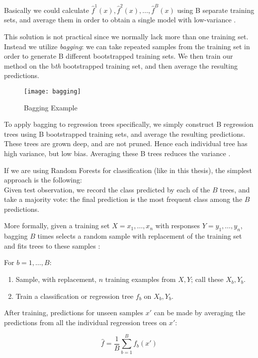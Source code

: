 Basically we could calculate $\hat{f}^1(x), \hat{f}^2(x), \dots, \hat{f}^B(x)$ using B separate training sets, and average them in order to obtain a single model with low-variance \cite{ISLR}.

This solution is not practical since we normally lack more than one training set. \\
Instead we utilize \textit{bagging}: we can take repeated samples from the training set in order to generate B different bootstrapped training sets. We then train our method on the b\textit{th} bootstrapped training set, and then average the resulting predictions.

\begin{figure}[H]
	\centering
	\texttt{[image: bagging]}
	\caption{Bagging Example \cite{bagging}}
	\label{fig:bagging}
\end{figure}

To apply bagging to regression trees specifically, we simply construct B regression trees using B bootstrapped training sets, and average the resulting predictions. These trees are grown deep, and are not pruned. Hence each individual tree has high variance, but low bias. Averaging these B trees reduces the variance \cite{ISLR}.

If we are using Random Forests for classification (like in this thesis), the simplest approach is the following: \\
Given test observation, we record the class predicted by each of the $B$ trees, and take a majority vote: the final prediction is the most frequent class among the $B$ predictions.

More formally, given a training set $X = x_1, \dots, x_n$ with responses $Y = y_1, \dots, y_n$, bagging $B$ times selects a random sample with replacement of the training set and fits trees to these samples \cite{wiki:randomforest}:

For $b = 1, \dots, B$:
\begin{enumerate}[noitemsep]
	\item Sample, with replacement, $n$ training examples from $X, Y$; call these $X_b, Y_b$.
	\item Train a classification or regression tree $f_b$ on $X_b, Y_b$.
\end{enumerate}

After training, predictions for unseen samples $x'$ can be made by averaging the predictions from all the individual regression trees on $x'$:

\begin{equation}
{{\hat {f}}={\frac {1}{B}}\sum _{b=1}^{B}f_{b}(x')}
\end{equation}

